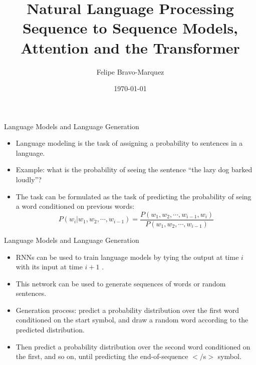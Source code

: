 \documentclass[handout]{beamer}
\title{Natural Language Processing \\ Sequence to Sequence Models, Attention and the Transformer}
\author[Felipe Bravo Márquez]{\footnotesize
 \textcolor[rgb]{0.00,0.00,1.00}{Felipe Bravo-Marquez}}
\date{\today}
\begin{document}
\begin{frame}
\titlepage


\end{frame}




\begin{frame}{Language Models and Language Generation}
\begin{scriptsize}
\begin{itemize}
\item Language modeling is the task of assigning a probability to sentences in a language.
\item Example: what is the probability of seeing the sentence ``the lazy dog barked loudly''?
\item The task can be formulated as the task of predicting the probability of seing a word conditioned on previous words:
\begin{displaymath}
 P(w_i | w_1, w_2, \cdots, w_{i-1}) = \frac{P(w_1, w_2, \cdots, w_{i-1}, w_i)}{P(w_1, w_2, \cdots, w_{i-1})}  
\end{displaymath}

\end{itemize}
\end{scriptsize}
\end{frame}


\begin{frame}{Language Models and Language Generation}
\begin{scriptsize}
\begin{itemize}
\item  RNNs can be used to train language models by tying the output at time $i$ with its input at time $i + 1$ .
\item This network can be used to generate sequences of words or random sentences.
\item Generation process: predict a probability distribution over the first word conditioned on the start symbol, and draw a random word according to the predicted
distribution.

\item Then predict a probability distribution over the second word conditioned on the first, and so on, until predicting the end-of-sequence $</$s$>$ symbol.
\end{itemize}
\end{scriptsize}
\end{frame}
\end{document}
